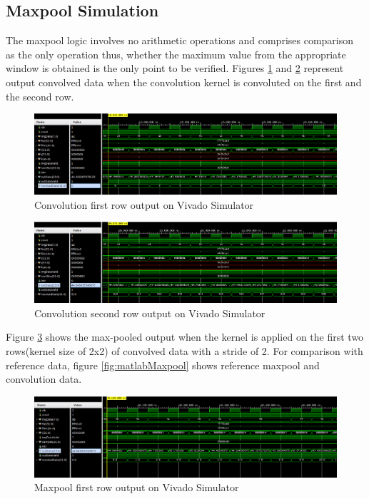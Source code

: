     \subsection{Maxpool Simulation}
    \noindent
    The maxpool logic involves no arithmetic operations and comprises comparison as the only operation thus, whether the maximum value from the appropriate window is obtained is the only point to be verified.
    Figures \ref{fig:convWindow1} and  \ref{fig:convWindow2} represent output convolved data when the convolution kernel is convoluted on the first and the second row. 
    \begin{figure}
        \centering
        \includegraphics[width=\linewidth]{images/convWindow1.png}
        \caption{Convolution first row output on Vivado Simulator}
        \label{fig:convWindow1}
    \end{figure}
    \begin{figure}
        \centering
        \includegraphics[width=\linewidth]{images/convWindow2.png}
        \caption{Convolution second row output on Vivado Simulator}    
        \label{fig:convWindow2}
    \end{figure}

    \noindent
    Figure \ref{fig:maxpoolrow1} shows the max-pooled output when the kernel is applied on the first two rows(kernel size of 2x2) of convolved data with a stride of 2. For comparison with reference data, figure \ref{fig:matlabMaxpool} shows reference maxpool and convolution data.

    \begin{figure}
        \centering
        \includegraphics[width=\linewidth]{images/maxpoolRow1.png}
        \caption{Maxpool first row output on Vivado Simulator}
        \label{fig:maxpoolrow1}
    \end{figure}

